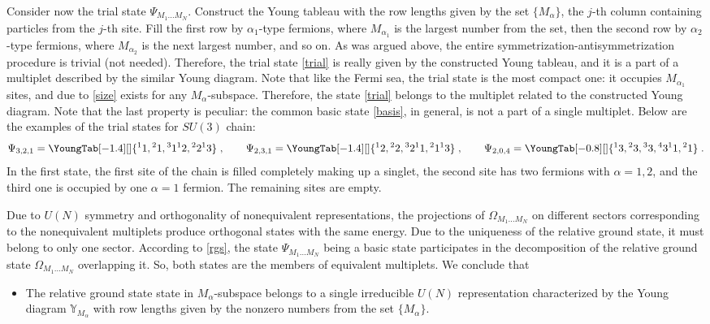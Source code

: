 \documentclass[pdftex]{sigma}
\newcommand{\yn}{\mathbb{Y}}
\begin{document}
Consider now the trial  state $\Psi_{M_1\dots M_N}$.  Construct the Young tableau
with the row lengths given by the set $\{M_\alpha\}$, the $j$-th column containing particles from the $j$-th site.
Fill the f\/irst row by  $\alpha_1$-type fermions, where $M_{\alpha_1}$ is the largest number from the set, then
the second row  by  $\alpha_2$-type fermions, where $M_{\alpha_2}$ is the next largest number,
and so on. As was argued above,  the entire symmetrization-antisymmetrization
procedure is trivial (not needed).
Therefore, the trial state \eqref{trial} is really given  by the constructed Young tableau,
and it is a part of a multiplet described by the similar Young diagram.
Note that like the Fermi sea, the trial state is the most compact one: it occupies $M_{\alpha_1}$ sites,
and due to \eqref{size}  exists for any $M_\alpha$-subspace.
Therefore, the state \eqref{trial} belongs to the multiplet related to the
constructed Young diagram. Note that the last property is peculiar: the
common basic  state \eqref{basis}, in general, is not a part of a single multiplet.
Below are the examples of the trial states for $SU(3)$ chain:
\[
\Psi_{3,2,1} =\YoungTab[-1.4][\normalsize]{ {{}^1 1,{}^2 1,{}^3 1} {{}^1 2,{}^2 2 } {{}^1 3 }}
\;,
\qquad
\Psi_{2,3,1}=\YoungTab[-1.4][\normalsize]{ {{}^1 2,{}^2 2,{}^3 2} {{}^1 1,{}^2 1 } {{}^1 3 }}
\;,
\qquad
\Psi_{2,0,4}=\YoungTab[-0.8][\normalsize]{ {{}^1 3,{}^2 3,{}^3 3, {}^4 3 } {{}^1 1,{}^2 1 } }
\;.
\]
In the f\/irst state, the f\/irst site of the chain is f\/illed completely making up a singlet,
the second site has two fermions with $\alpha=1,2$, and the third one is occupied by one $\alpha=1$ fermion.
The remaining sites are empty.

Due to $U(N)$ symmetry and orthogonality of nonequivalent representations,
the projections of
$\Omega_{M_1\dots M_N}$ on dif\/ferent sectors corresponding to the nonequivalent
multiplets produce orthogonal states with the same energy.
Due to the uniqueness of the relative ground state, it must belong to only one sector.
According to \eqref{rgs}, the state $\Psi_{M_1\dots M_N}$ being a basic state
participates in the decomposition of the relative ground state $\Omega_{M_1\dots M_N}$
overlapping it. So, both states are the members of equivalent multiplets.
We conclude that
\begin{itemize}\itemsep=0pt
\item
The relative ground state state in $M_\alpha$-subspace
belongs to a single irreducible $U(N)$ representation
characterized by the Young diagram $\yn_{M_\alpha}$
with row lengths given by the nonzero numbers from the set $\{M_\alpha\}$.
\end{itemize}
\end{document}

